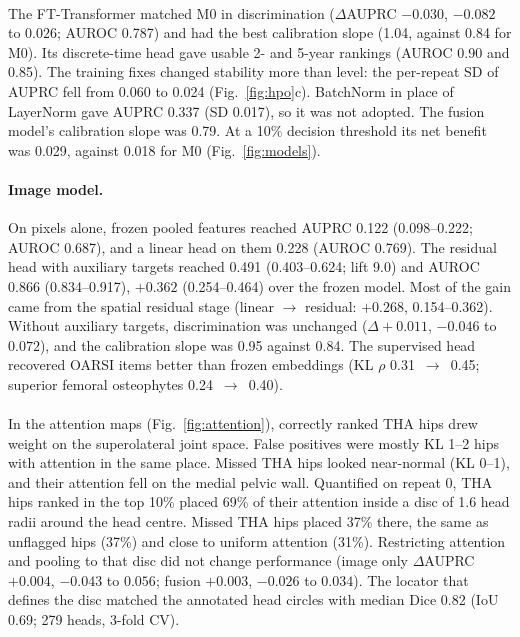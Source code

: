 \paragraph{}
The FT-Transformer matched M0 in discrimination ($\Delta$AUPRC $-0.030$, $-0.082$ to $0.026$; AUROC 0.787) and had the
best calibration slope (1.04, against 0.84 for M0). Its discrete-time head gave usable 2- and 5-year rankings (AUROC 0.90
and 0.85). The training fixes changed stability more than level: the per-repeat SD of AUPRC fell from 0.060 to 0.024
(Fig.~\ref{fig:hpo}c). BatchNorm in place of LayerNorm gave AUPRC 0.337 (SD 0.017), so it was not adopted. The fusion
model's calibration slope was 0.79. At a 10\% decision threshold its net benefit was 0.029, against 0.018 for M0
(Fig.~\ref{fig:models}).

\paragraph{Image model.}
On pixels alone, frozen pooled features reached AUPRC 0.122 (0.098--0.222; AUROC 0.687), and a linear head on them
0.228 (AUROC 0.769). The residual head with auxiliary targets reached 0.491 (0.403--0.624; lift 9.0) and AUROC 0.866
(0.834--0.917), $+0.362$ (0.254--0.464) over
the frozen model. Most of the gain came from the spatial residual stage (linear $\to$ residual: $+0.268$,
0.154--0.362). Without auxiliary targets, discrimination was unchanged ($\Delta+0.011$, $-0.046$ to $0.072$), and the
calibration slope was 0.95 against 0.84. The supervised head recovered OARSI items better than frozen embeddings (KL
$\rho$ 0.31~$\to$~0.45; superior femoral osteophytes 0.24~$\to$~0.40).

\paragraph{}
In the attention maps (Fig.~\ref{fig:attention}), correctly ranked THA hips drew weight on the superolateral joint
space. False positives were mostly KL 1--2 hips with attention in the same place. Missed THA hips looked near-normal
(KL 0--1), and their attention fell on the medial pelvic wall. Quantified on repeat 0, THA hips ranked in the top 10\%
placed 69\% of their attention inside a disc of 1.6 head radii around the head centre. Missed THA hips placed 37\%
there, the same as unflagged hips (37\%) and close to uniform attention (31\%). Restricting attention and pooling to
that disc did not change performance (image only $\Delta$AUPRC $+0.004$, $-0.043$ to $0.056$; fusion $+0.003$,
$-0.026$ to $0.034$). The locator that defines the disc matched the annotated head circles with median Dice 0.82
(IoU 0.69; 279 heads, 3-fold CV).


